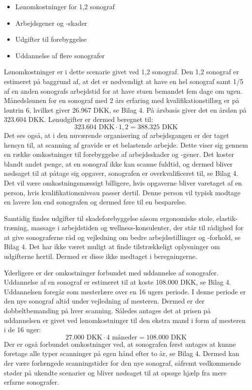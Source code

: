 \begin{itemize}
\item Lønomkostninger for 1,2 sonograf
\item Arbejdsgener og -skader
\item Udgifter til forebyggelse
\item Uddannelse af flere sonografer
\end{itemize}
Lønomkostninger er i dette scenarie givet ved 1,2 sonograf. Den 1,2 sonograf er estimeret på baggrund af, at det er nødvendigt at have en hel sonograf samt 1/5 af en anden sonografs arbejdstid for at have stuen bemandet fem dage om ugen. Månedslønnen for en sonograf med 2 års erfaring med kvalifikationstillæg er på løntrin 6, hvilket giver 26.967 DKK, se Bilag 4. På årsbasis giver det en årsløn på 323.604 DKK. Lønudgifter er dermed beregnet til:
\begin{equation}
323.604 \text{ DKK}\cdot1,2 = 388.325 \text{ DKK}
\end{equation}
Det ses også, at i den nuværende organisering af arbejdsgangen er der taget hensyn til, at scanning af gravide er et belastende arbejde. Dette viser sig gennem en række omkostninger til forebyggelse af arbejdsskader og -gener. Det koster blandt andet penge, at en sonograf ikke kan scanne fuldtid, og dermed bliver nødsaget til at påtage sig opgaver, sonografen er overkvalificeret til, se Bilag 4. Det vil være omkostningsmæssigt billigere, hvis opgaverne bliver varetaget af en person, hvis kvalifikationsniveau passer dertil. Denne person vil typisk modtage en lavere løn end sonografen og dermed føre til en besparelse.

Samtidig findes udgifter til skadeforebyggelse såsom ergonomiske stole, elastik-træning, massage i arbejdstiden og wellness-konsulenter, der står til rådighed for at give sonograferne råd og vejledning om bedre arbejdsstillinger og -forhold, se Bilag 4. Det har ikke været muligt at finde tilstrækkeligt oplysninger om udgifterne hertil. Dermed er disse ikke medtaget i beregningerne. 

Yderligere er der omkostninger forbundet med uddannelse af sonografer. Uddannelse af en sonograf er estimeret til at koste 108.000 DKK, se Bilag 4. Uddannelsen foregår som mesterlære over en 16 ugers periode. I denne periode er den nye sonograf altid under vejledning af mesteren. Dermed er der dobbeltbemanding på hver scanning. Således antages det at prisen på uddannelsen er givet ved lønomkostninger til den ekstra mand i form af mesteren i de 16 uger:
\begin{equation}
27.000 \text{ DKK}\cdot4 \text{ måneder} = 108.000 \text{ DKK}
\end{equation}
Der er også forbundet omkostninger ved, at sonografen først antages at kunne foretage alle typer scanninger på egen hånd efter to år, se Bilag 4. Dermed kan der være forlængede scanningstider for den nye sonograf, såfremt vedkommende støder på ukendte scenarier og bliver nødsaget til at opsøge hjælp fra mere erfarne sonografer.

